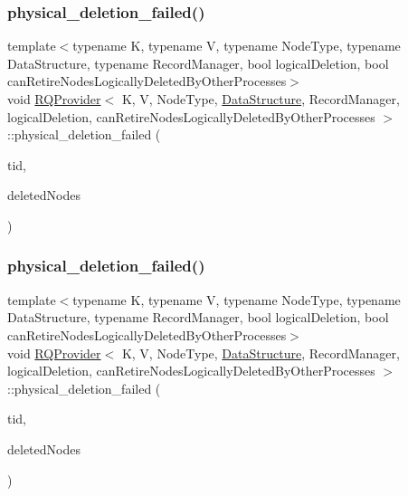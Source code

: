 \mbox{\label{classRQProvider_a1fb29a074556e0431ed22f2bee394c22}} 
\subsubsection{\texorpdfstring{physical\+\_\+deletion\+\_\+failed()}{physical\_deletion\_failed()}\hspace{0.1cm}{\footnotesize\ttfamily [2/5]}}
{\footnotesize\ttfamily template$<$typename K, typename V, typename Node\+Type, typename Data\+Structure, typename Record\+Manager, bool logical\+Deletion, bool can\+Retire\+Nodes\+Logically\+Deleted\+By\+Other\+Processes$>$ \\
void \hyperlink{classRQProvider}{R\+Q\+Provider}$<$ K, V, Node\+Type, \hyperlink{classDataStructure}{Data\+Structure}, Record\+Manager, logical\+Deletion, can\+Retire\+Nodes\+Logically\+Deleted\+By\+Other\+Processes $>$\+::physical\+\_\+deletion\+\_\+failed (\begin{DoxyParamCaption}\item[{const int}]{tid,  }\item[{Node\+Type $\ast$const $\ast$const}]{deleted\+Nodes }\end{DoxyParamCaption})\hspace{0.3cm}{\ttfamily [inline]}}

\mbox{\label{classRQProvider_a1fb29a074556e0431ed22f2bee394c22}} 
\subsubsection{\texorpdfstring{physical\+\_\+deletion\+\_\+failed()}{physical\_deletion\_failed()}\hspace{0.1cm}{\footnotesize\ttfamily [3/5]}}
{\footnotesize\ttfamily template$<$typename K, typename V, typename Node\+Type, typename Data\+Structure, typename Record\+Manager, bool logical\+Deletion, bool can\+Retire\+Nodes\+Logically\+Deleted\+By\+Other\+Processes$>$ \\
void \hyperlink{classRQProvider}{R\+Q\+Provider}$<$ K, V, Node\+Type, \hyperlink{classDataStructure}{Data\+Structure}, Record\+Manager, logical\+Deletion, can\+Retire\+Nodes\+Logically\+Deleted\+By\+Other\+Processes $>$\+::physical\+\_\+deletion\+\_\+failed (\begin{DoxyParamCaption}\item[{const int}]{tid,  }\item[{Node\+Type $\ast$const $\ast$const}]{deleted\+Nodes }\end{DoxyParamCaption})\hspace{0.3cm}{\ttfamily [inline]}}

